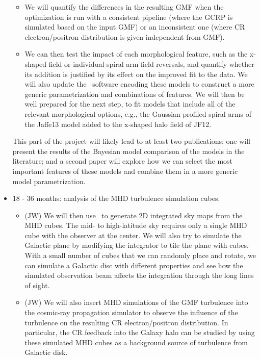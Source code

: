 \begin{itemize}
\begin{itemize}
\item We will quantify the differences in the resulting GMF when the optimization is run with a consistent pipeline (where the GCRP is simulated based on the input GMF) or an inconsistent one (where CR electron/positron distribution is given independent from GMF).  

\item We can then test the impact of each morphological feature, such
  as the x-shaped field or individual spiral arm field reversals, and
  quantify whether its addition is justified by its effect on the
  improved fit to the data. We will also update the \hammurabix\ software encoding
  these models to construct a more generic parametrization and combinations of features. We will then be well prepared for the next step, 
  to fit models that include all 
  of the relevant morphological options, e.g., the Gaussian-profiled
  spiral arms of the Jaffe13 model added to the x-shaped halo field of
  JF12.

\end{itemize}

This part of the project will likely lead to at least two publications:  one will present the results of the Bayesian model comparison of the models in the literature; and a second paper will explore how we can select the most important features of these models and combine them in a more generic model parametrization. 
 
\item 18 - 36 months: analysis of the MHD turbulence simulation
  cubes. 

\begin{itemize}
\item (JW) We will then use \hammurabi\ to generate 2D integrated sky maps
  from the MHD cubes. The mid- to high-latitude sky requires only a
  single MHD cube with the observer at the center. We will also try to
  simulate the Galactic plane by modifying the integrator to tile the
  plane with cubes. With a small number of cubes that we can 
  randomly place and rotate, we can simulate a Galactic disc with different
  properties and see how the simulated observation beam affects the 
  integration through the long lines of sight.

\item (JW) We will also insert MHD simulations of the GMF turbulence into the cosmic-ray propagation simulator to observe the influence of the turbulence on the resulting CR electron/positron distribution.  In particular, the CR feedback into the Galaxy halo can be studied by using these simulated MHD cubes as a background source of  turbulence from Galactic disk. 


\end{itemize}
\end{itemize}
